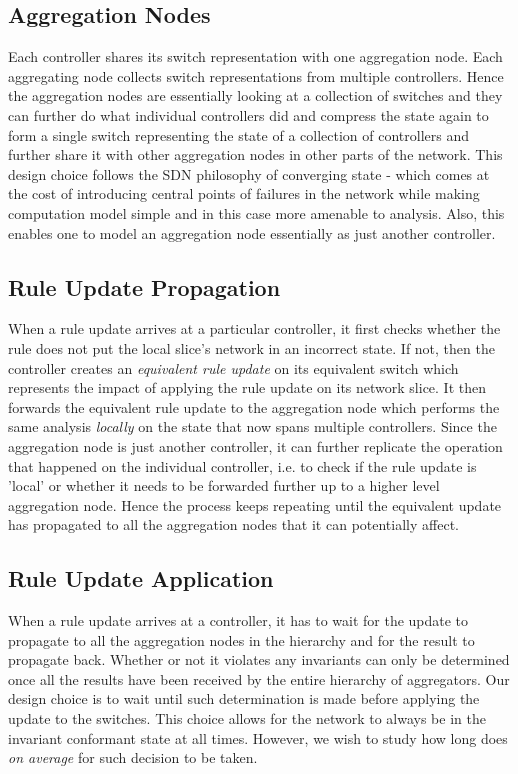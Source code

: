 \documentclass[conference]{IEEEtran}
\begin{document}
\subsection{Aggregation Nodes}
Each controller shares its switch representation with one aggregation node. Each aggregating node collects switch representations from multiple controllers. Hence the aggregation nodes are essentially looking at a collection of switches and they can further do what individual controllers did and compress the state again to form a single switch representing the state of a collection of controllers and further share it with other aggregation nodes in other parts of the network. This design choice follows the SDN philosophy of converging state - which comes at the cost of introducing central points of failures in the network while making computation model simple and in this case more amenable to analysis. Also, this enables one to model an aggregation node essentially as just another controller.

\subsection{Rule Update Propagation}
When a rule update arrives at a particular controller, it first checks whether the rule does not put the local slice's network in an incorrect state. If not, then the controller creates an \textit{equivalent rule update} on its equivalent switch which represents the impact of applying the rule update on its network slice. It then forwards the equivalent rule update to the aggregation node which performs the same analysis \textit{locally} on the state that now spans multiple controllers. Since the aggregation node is just another controller, it can further replicate the operation that happened on the individual controller, i.e. to check if the rule update is 'local' or whether it needs to be forwarded further up to a higher level aggregation node. Hence the process keeps repeating until the equivalent update has propagated to all the aggregation nodes that it can potentially affect. 

\subsection{Rule Update Application}
When a rule update arrives at a controller, it has to wait for the update to propagate to all the aggregation nodes in the hierarchy and for the result to propagate back. Whether or not it violates any invariants can only be determined once all the results have been received by the entire hierarchy of aggregators. Our design choice is to wait until such determination is made before applying the update to the switches. This choice allows for the network to always be in the invariant conformant state at all times. However, we wish to study how long does \textit{on average} for such decision to be taken.
\end{document}
